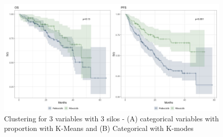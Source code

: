 

\begin{figure}[ht]
  \caption{Clustering for 3 variables with 3 silos - (A) categorical variables with  proportion with K-Means and (B)  Categorical with K-modes  }\label{fig:interest} 
  \includegraphics[width=\linewidth]{figures/interest_curve_both.jpeg}%

\end{figure}


